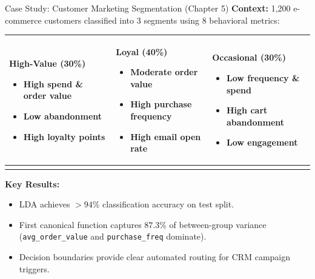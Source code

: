 \documentclass[aspectratio=169,ignorenonframetext]{beamer}
\begin{document}
\begin{frame}[fragile]{Case Study: Customer Marketing Segmentation
(Chapter 5)}
\textbf{Context:} 1,200 e-commerce customers classified into 3 segments
using 8 behavioral metrics:

{\def\LTcaptype{none} %
\begin{longtable}[]{@{}
  >{\raggedright\arraybackslash}p{}
  >{\raggedright\arraybackslash}p{}
  >{\raggedright\arraybackslash}p{}@{}}
\toprule\noalign{}
\endhead
\begin{minipage}[t]{\linewidth}\raggedright
\textbf{High-Value (30\%)}

\begin{itemize}
\item
  High spend \& order value
\item
  Low abandonment
\item
  High loyalty points
\end{itemize}
\end{minipage} & \begin{minipage}[t]{\linewidth}\raggedright
\textbf{Loyal (40\%)}

\begin{itemize}
\item
  Moderate order value
\item
  High purchase frequency
\item
  High email open rate
\end{itemize}
\end{minipage} & \begin{minipage}[t]{\linewidth}\raggedright
\textbf{Occasional (30\%)}

\begin{itemize}
\item
  Low frequency \& spend
\item
  High cart abandonment
\item
  Low engagement
\end{itemize}
\end{minipage} \\
\bottomrule\noalign{}
\end{longtable}
}

\textbf{Key Results:}

\begin{itemize}
\item
  LDA achieves \(> 94\%\) classification accuracy on test split.
\item
  First canonical function captures \(87.3\%\) of between-group variance
  (\texttt{avg\_order\_value} and \texttt{purchase\_freq} dominate).
\item
  Decision boundaries provide clear automated routing for CRM campaign
  triggers.
\end{itemize}
\end{frame}
\end{document}
